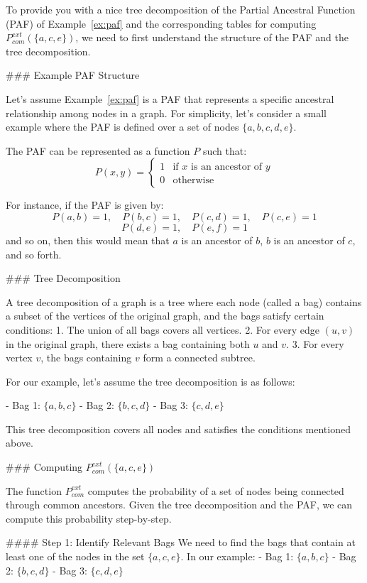 To provide you with a nice tree decomposition of the Partial Ancestral Function (PAF) of Example~\ref{ex:paf} and the corresponding tables for computing \( P^{\mathit{ext}}_{com}(\{a, c, e\}) \), we need to first understand the structure of the PAF and the tree decomposition.

### Example PAF Structure

Let's assume Example~\ref{ex:paf} is a PAF that represents a specific ancestral relationship among nodes in a graph. For simplicity, let's consider a small example where the PAF is defined over a set of nodes \(\{a, b, c, d, e\}\).

The PAF can be represented as a function \( P \) such that:
\[ P(x, y) = \begin{cases} 
1 & \text{if } x \text{ is an ancestor of } y \\
0 & \text{otherwise}
\end{cases} \]

For instance, if the PAF is given by:
\[ P(a, b) = 1, \quad P(b, c) = 1, \quad P(c, d) = 1, \quad P(c, e) = 1 \]
\[ P(d, e) = 1, \quad P(e, f) = 1 \]
and so on, then this would mean that \(a\) is an ancestor of \(b\), \(b\) is an ancestor of \(c\), and so forth.

### Tree Decomposition

A tree decomposition of a graph is a tree where each node (called a bag) contains a subset of the vertices of the original graph, and the bags satisfy certain conditions:
1. The union of all bags covers all vertices.
2. For every edge \((u, v)\) in the original graph, there exists a bag containing both \(u\) and \(v\).
3. For every vertex \(v\), the bags containing \(v\) form a connected subtree.

For our example, let's assume the tree decomposition is as follows:

- Bag 1: \(\{a, b, c\}\)
- Bag 2: \(\{b, c, d\}\)
- Bag 3: \(\{c, d, e\}\)

This tree decomposition covers all nodes and satisfies the conditions mentioned above.

### Computing \( P^{\mathit{ext}}_{com}(\{a, c, e\}) \)

The function \( P^{\mathit{ext}}_{com} \) computes the probability of a set of nodes being connected through common ancestors. Given the tree decomposition and the PAF, we can compute this probability step-by-step.

#### Step 1: Identify Relevant Bags
We need to find the bags that contain at least one of the nodes in the set \(\{a, c, e\}\). In our example:
- Bag 1: \(\{a, b, c\}\)
- Bag 2: \(\{b, c, d\}\)
- Bag 3: \(\{c, d, e\}\)

